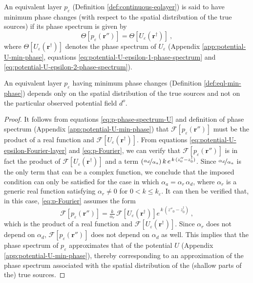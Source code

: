 \begin{definition}
	An equivalent layer $p_{\varepsilon}$ (Definition \ref{def:continuous-eqlayer}) is said to have minimum 
	phase changes (with respect to the spatial distribution of the true sources) if its phase spectrum is given by
	\begin{equation}
		\Theta [ p_{\varepsilon}(\mathbf{r}'') ] = \Theta [ U_{\varepsilon}(\mathbf{r}^{\dagger}) ] \: ,
		\label{eq:p-phase-spectrum-U}
	\end{equation}
	where $\Theta [ U_{\varepsilon}(\mathbf{r}^{\dagger}) ]$ denotes the phase spectrum of $U_{\varepsilon}$ 
	(Appendix \ref{app:potential-U-min-phase}, equations \ref{eq:potential-U-epsilon-1-phase-spectrum} and \ref{eq:potential-U-epsilon-2-phase-spectrum}).
	\label{def:eql-min-phase}
\end{definition}
\begin{proposition}
	\label{prop:minimum-phase-change-layers}
	An equivalent layer $p_{\varepsilon}$ having minimum phase changes (Definition \ref{def:eql-min-phase})
	depends only on the spatial distribution of the true sources and not on the particular observed 
	potential field $d^{o}$.
\end{proposition}
\begin{proof}
	It follows from equations \ref{eq:p-phase-spectrum-U} and definition of phase spectrum (Appendix \ref{app:potential-U-min-phase}) that 
	$\mathcal{F} [ p_{\varepsilon}(\mathbf{r}'') ]$ must be the product of a real function and
	$\mathcal{F} [ U_{\varepsilon}(\mathbf{r}^{\dagger}) ]$.
	From equations \ref{eq:potential-U-epsilon-Fourier-layer} and \ref{eq:p-Fourier}, we can verify that 
	$\mathcal{F} [ p_{\varepsilon}(\mathbf{r}'') ]$ is in fact the product of 
	$\mathcal{F} [ U_{\varepsilon}(\mathbf{r}^{\dagger}) ]$ 
	and a term $\left( \nicefrac{\alpha_{d}}{\alpha_{a}} \right) k \, e^{\, k \, (z''_{0} - z^{\dagger}_{0})}$. 
	Since $\nicefrac{\alpha_{d}}{\alpha_{a}}$ is the only term that can be a complex function, we conclude that 
	the imposed condition can only be satisfied for the case in which $\alpha_{a} = \alpha_{r} \, \alpha_{d}$, 
	where $\alpha_{r}$ is a generic real function satisfying $\alpha_{r} \ne 0$ for $0 < k \le k_{\varepsilon}$.
	It can then be verified that, in this case, \ref{eq:p-Fourier} assumes the form
	\begin{equation}
		\mathcal{F} [ p_{\varepsilon}(\mathbf{r}'') ] =
		\tfrac{k}{\alpha_{r}} \, \mathcal{F} [ U_{\varepsilon}(\mathbf{r}^{\dagger}) ] 
		e^{\, k \, (z''_{0} - z^{\dagger}_{0})} \: ,
		\label{eq:p-Fourier-min-phase}
	\end{equation}
	which is the product of a real function and $\mathcal{F} [ U_{\varepsilon}(\mathbf{r}^{\dagger}) ]$.
	Since $\alpha_{r}$ does not depend on $\alpha_{d}$, $\mathcal{F} [ p_{\varepsilon}(\mathbf{r}'') ]$ does not 
	depend on $\alpha_{d}$ as well. This implies that the phase spectrum of $p_{\varepsilon}$ approximates that 
	of the potential $U$ (Appendix \ref{app:potential-U-min-phase}), thereby corresponding to an approximation 
	of the phase spectrum associated with the spatial distribution of the (shallow parts of the) true sources.
\end{proof}

